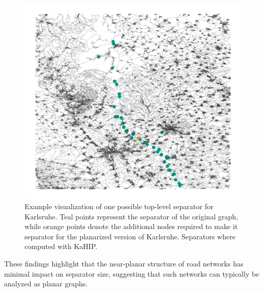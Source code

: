 \begin{figure}
	\centering
	\includegraphics[width=0.8\linewidth]{graphics/karlsruhe_top_level_sep_extended_to_planar.png}
	\caption{Example visualization of one possible top-level separator for
		Karlsruhe. Teal points represent the separator of the original graph, while
		orange points denote the additional nodes required to make it separator
		for the planarized version of Karlsruhe. Separators where computed with
		KaHIP.} \label{fig:karlsruhe_planar_vs_non_planar}
\end{figure}

These findings highlight that the near-planar structure of road networks has
minimal impact on separator size, suggesting that such networks can typically
be analyzed as planar graphs.
